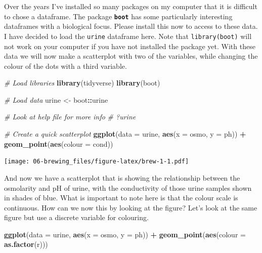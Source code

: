 \documentclass[]{book}
\newenvironment{Shaded}{\begin{snugshade}}{\end{snugshade}}
\newcommand{\KeywordTok}[1]{\textcolor[rgb]{0.13,0.29,0.53}{\textbf{#1}}}
\newcommand{\DataTypeTok}[1]{\textcolor[rgb]{0.13,0.29,0.53}{#1}}
\newcommand{\StringTok}[1]{\textcolor[rgb]{0.31,0.60,0.02}{#1}}
\newcommand{\CommentTok}[1]{\textcolor[rgb]{0.56,0.35,0.01}{\textit{#1}}}
\newcommand{\OperatorTok}[1]{\textcolor[rgb]{0.81,0.36,0.00}{\textbf{#1}}}
\newcommand{\NormalTok}[1]{#1}
\theoremstyle{definition}
\theoremstyle{definition}
\theoremstyle{definition}
\theoremstyle{remark}
\begin{document}
Over the years I've installed so many packages on my computer that it is
difficult to chose a dataframe. The package \textbf{\texttt{boot}} has
some particularly interesting dataframes with a biological focus. Please
install this now to access to these data. I have decided to load the
\texttt{urine} dataframe here. Note that \texttt{library(boot)} will not
work on your computer if you have not installed the package yet. With
these data we will now make a scatterplot with two of the variables,
while changing the colour of the dots with a third variable.

\begin{Shaded}
\begin{Highlighting}[]
\CommentTok{# Load libraries}
\KeywordTok{library}\NormalTok{(tidyverse)}
\KeywordTok{library}\NormalTok{(boot)}

\CommentTok{# Load data}
\NormalTok{urine <-}\StringTok{ }\NormalTok{boot}\OperatorTok{::}\NormalTok{urine}

\CommentTok{# Look at help file for more info}
\CommentTok{# ?urine}

\CommentTok{# Create a quick scatterplot}
\KeywordTok{ggplot}\NormalTok{(}\DataTypeTok{data =}\NormalTok{ urine, }\KeywordTok{aes}\NormalTok{(}\DataTypeTok{x =}\NormalTok{ osmo, }\DataTypeTok{y =}\NormalTok{ ph)) }\OperatorTok{+}
\StringTok{  }\KeywordTok{geom_point}\NormalTok{(}\KeywordTok{aes}\NormalTok{(}\DataTypeTok{colour =}\NormalTok{ cond))}
\end{Highlighting}
\end{Shaded}

\texttt{[image: 06-brewing\_files/figure-latex/brew-1-1.pdf]}

And now we have a scatterplot that is showing the relationship between
the osmolarity and pH of urine, with the conductivity of those urine
samples shown in shades of blue. What is important to note here is that
the colour scale is continuous. How can we now this by looking at the
figure? Let's look at the same figure but use a discrete variable for
colouring.

\begin{Shaded}
\begin{Highlighting}[]
\KeywordTok{ggplot}\NormalTok{(}\DataTypeTok{data =}\NormalTok{ urine, }\KeywordTok{aes}\NormalTok{(}\DataTypeTok{x =}\NormalTok{ osmo, }\DataTypeTok{y =}\NormalTok{ ph)) }\OperatorTok{+}
\StringTok{  }\KeywordTok{geom_point}\NormalTok{(}\KeywordTok{aes}\NormalTok{(}\DataTypeTok{colour =} \KeywordTok{as.factor}\NormalTok{(r)))}
\end{Highlighting}
\end{Shaded}
\end{document}
